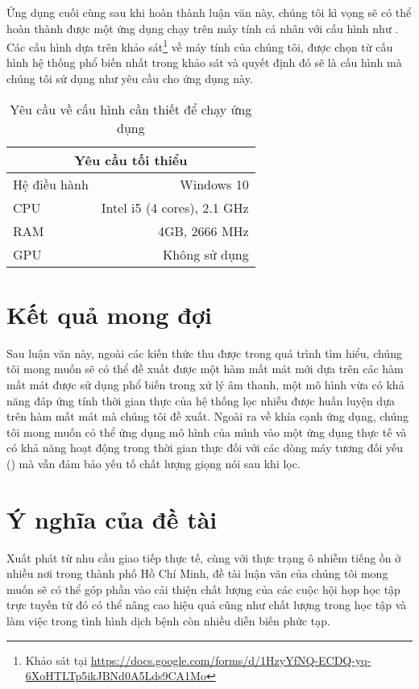 	
		Ứng dụng cuối cùng sau khi hoàn thành luận văn này, chúng tôi kì vọng sẽ có thể hoàn thành được một ứng dụng chạy trên máy tính cá nhân với cấu hình như . Các cấu hình dựa trên khảo sát\footnote{Khảo sát tại \url{https://docs.google.com/forms/d/1HzyYfNQ-ECDQ-yq-6XoHTLTp5ikJBNd0A5Lds9CA1Mo}} về máy tính của chúng tôi, được chọn từ cấu hình hệ thống phổ biến nhất trong khảo sát và quyết định đó sẽ là cấu hình mà chúng tôi sử dụng như yêu cầu cho ứng dụng này.
		
			\begin{table}[h]
				\centering
				\begin{tabular}{l r}
					\hline
					\multicolumn{2}{c}{\textbf{Yêu cầu tối thiểu}}\\
					\hline
					Hệ điều hành	& Windows 10\\
					CPU 			& Intel i5 (4 cores), 2.1 GHz \\
					RAM				& 4GB, 2666 MHz\\
					GPU				& Không sử dụng\\
					\hline
				\end{tabular}
				\caption{Yêu cầu về cấu hình cần thiết để chạy ứng dụng}
				\label{intro::req}
			\end{table}
		
	\section{Kết quả mong đợi}\label{section::intro::expected}
		
		Sau luận văn này, ngoài các kiến thức thu được trong quá trình tìm hiểu, chúng tôi mong muốn sẽ có thể đề xuất được một hàm mất mát mới dựa trên các hàm mất mát được sử dụng phổ biến trong xử lý âm thanh, một mô hình vừa có khả năng đáp ứng tính thời gian thực của hệ thống lọc nhiễu được huấn luyện dựa trên hàm mất mát mà chúng tôi đề xuất. Ngoài ra về khía cạnh ứng dụng, chúng tôi mong muốn có thể ứng dụng mô hình của mình vào một ứng dụng thực tế và có khả năng hoạt động trong thời gian thực đối với các dòng máy tương đối yếu () mà vẫn đảm bảo yếu tố chất lượng giọng nói sau khi lọc.

	\section{Ý nghĩa của đề tài}\label{section::intro::meaning}
	
		Xuất phát từ nhu cầu giao tiếp thực tế, cùng với thực trạng ô nhiễm tiếng ồn ở nhiều nơi trong thành phố Hồ Chí Minh, đề tài luận văn của chúng tôi mong muốn sẽ có thể góp phần vào cải thiện chất lượng của các cuộc hội họp học tập trực tuyến từ đó có thể nâng cao hiệu quả cũng như chất lượng trong học tập và làm việc trong tình hình dịch bệnh còn nhiều diễn biến phức tạp.
		
